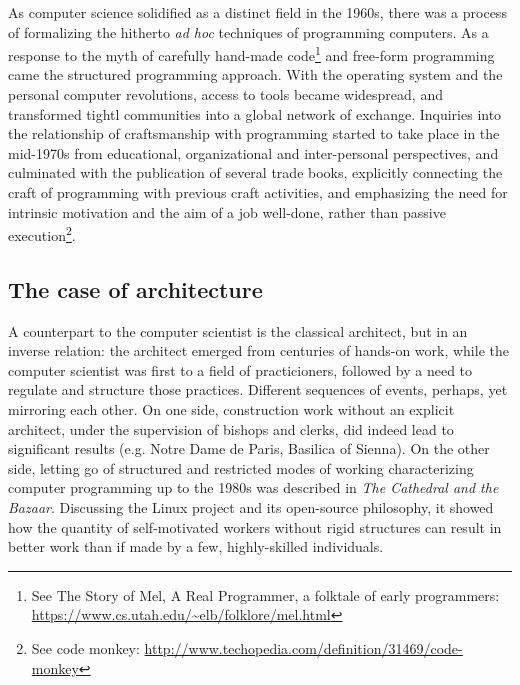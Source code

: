 \documentclass{article}
\begin{document}
As computer science solidified as a distinct field in the 1960s, there was a process of formalizing the hitherto \textit{ad hoc} techniques of programming computers. As a response to the myth of carefully hand-made code\footnote{See The Story of Mel, A Real Programmer, a folktale of early programmers: \url{https://www.cs.utah.edu/~elb/folklore/mel.html}} and free-form programming came the structured programming approach\cite{dijkstra_chapter_1972}. With the operating system and the personal computer revolutions, access to tools became widespread, and transformed tightl communities into a global network of exchange. Inquiries into the relationship of craftsmanship with programming started to take place in the mid-1970s from educational\cite{dijkstra_craftsman_1982}, organizational\cite{brooks_mythical_1975} and inter-personal perspectives\cite{weinberg_psychology_1998}, and culminated with the publication of several trade books\cite{martin_clean_2008,hendrickson_software_2002}, explicitly connecting the craft of programming with previous craft activities, and emphasizing the need for intrinsic motivation and the aim of a job well-done\cite{hoover_apprenticeship_2009,goodliffe_code_2007}, rather than passive execution\footnote{See code monkey: \url{http://www.techopedia.com/definition/31469/code-monkey}}.

\subsection{The case of architecture}

A counterpart to the computer scientist is the classical architect, but in an inverse relation: the architect emerged from centuries of hands-on work\cite{pevsner_term_1942}, while the computer scientist was first to a field of practicioners, followed by a need to regulate and structure those practices. Different sequences of events, perhaps, yet mirroring each other. On one side, construction work without an explicit architect, under the supervision of bishops and clerks, did indeed lead to significant results (e.g. Notre Dame de Paris, Basilica of Sienna). On the other side, letting go of structured and restricted modes of working characterizing computer programming up to the 1980s was described in \textit{The Cathedral and the Bazaar}. Discussing the Linux project and its open-source philosophy, it showed how the quantity of self-motivated workers without rigid structures can result in better work than if made by a few, highly-skilled individuals\cite{raymond_cathedral_2001}.
\end{document}
